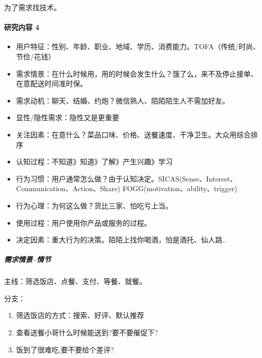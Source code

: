 \documentclass[letterpaper,11pt,english]{sphinxmanual}
\begin{document}
为了需求找技术。


\paragraph{研究内容 4\sphinxfootnotemark[159]}
\label{\detokenize{chapter_skill/users_analysis:id17}}%
\begin{footnotetext}[159]\sphinxAtStartFootnote
{}
%
\end{footnotetext}\ignorespaces \begin{itemize}
\item {} 
用户特征：性别、年龄、职业、地域、学历、消费能力。TOFA（传统/时尚、节俭/花钱）

\item {} 
需求情景：在什么时候用，用的时候会发生什么？饿了么，来不及停止接单、在意配送时间准时保。

\item {} 
需求动机：聊天、结婚、约炮？微信熟人、陌陌陌生人不需加好友。

\item {} 
显性/隐性需求：隐性又是更重要

\item {} 
关注因素：在意什么？菜品口味、价格、送餐速度、干净卫生。大众用综合排序

\item {} 
认知过程：不知道》知道》了解》产生兴趣》学习

\item {} 
行为习惯：用户通常怎么做？由于认知决定。SICAS(Sense、Interest、Communication、Action、Share)
FOGG(motivation、ability、trigger)

\item {} 
行为心理：为何这么做？货比三家、怕吃亏上当。

\item {} 
使用过程：用户使用你产品或服务的过程。

\item {} 
决定因素：重大行为的决策。陌陌上找你喝酒，怕是酒托、仙人跳..

\end{itemize}


\subparagraph{需求情景–情节}
\label{\detokenize{chapter_skill/users_analysis:id18}}
主线：筛选饭店、点餐、支付、等餐、就餐。

分支：
\begin{enumerate}
%
\item {} 
筛选饭店的方式：搜索、好评、默认推荐

\item {} 
查看送餐小哥什么时候能送到?要不要催促下?

\item {} 
饭到了很难吃,要不要给个差评?

\end{enumerate}
\end{document}
